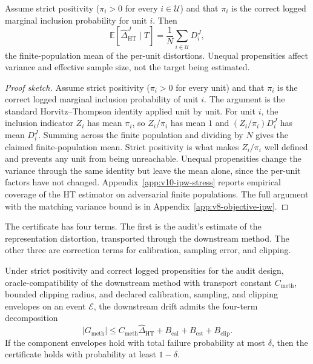 \begin{proposition}
\label{prop:v10-ht-unbiased}
Assume strict positivity (\(\pi_i>0\) for every \(i\in\mathcal U\)) and
that \(\pi_i\) is the correct logged marginal inclusion probability
for unit \(i\). Then
\[
  \mathbb E\!\left[\widehat{\Delta}_{\mathrm{HT}}^{J}\mid T\right]
  =
  \frac{1}{N}\sum_{i\in\mathcal U}D_i^J ,
\]
the finite-population mean of the per-unit distortions. Unequal
propensities affect variance and effective sample size, not the
target being estimated.
\end{proposition}

\begin{proof}[Proof sketch]
Assume strict positivity (\(\pi_i>0\) for every unit) and that
\(\pi_i\) is the correct logged marginal inclusion probability of
unit \(i\). The argument is the standard Horvitz--Thompson identity
applied unit by unit. For unit \(i\), the inclusion indicator
\(Z_i\) has mean \(\pi_i\), so \(Z_i/\pi_i\) has mean \(1\) and
\((Z_i/\pi_i)D_i^J\) has mean \(D_i^J\). Summing across the finite
population and dividing by \(N\) gives the claimed finite-population
mean. Strict positivity is what makes \(Z_i/\pi_i\) well defined and
prevents any unit from being unreachable. Unequal propensities
change the variance through the same identity but leave the mean
alone, since the per-unit factors have not changed.
Appendix~\ref{app:v10-ipw-stress} reports empirical coverage of the
HT estimator on adversarial finite populations. The full argument
with the matching variance bound is in
Appendix~\ref{app:v8-objective-ipw}.
\end{proof}

The certificate has four terms. The first is the audit's estimate of
the representation distortion, transported through the downstream
method. The other three are correction terms for calibration,
sampling error, and clipping.

\begin{proposition}
\label{prop:v10-finite-sample-certificate}
Under strict positivity and correct logged propensities for the
audit design, oracle-compatibility of the downstream method with
transport constant \(C_{\mathrm{meth}}\), bounded clipping radius,
and declared calibration, sampling, and clipping envelopes on an
event \(\mathcal E\), the downstream drift admits the four-term
decomposition
\begin{equation}
\label{eq:v8-finite-sample-certificate}
  |G_{\mathrm{meth}}|
  \le
  C_{\mathrm{meth}}\widehat{\Delta}_{\mathrm{HT}}
  +
  B_{\mathrm{cal}}
  +
  B_{\mathrm{est}}
  +
  B_{\mathrm{clip}} .
\end{equation}
If the component envelopes hold with total failure probability at
most \(\delta\), then the certificate holds with probability at least
\(1-\delta\).
\end{proposition}

